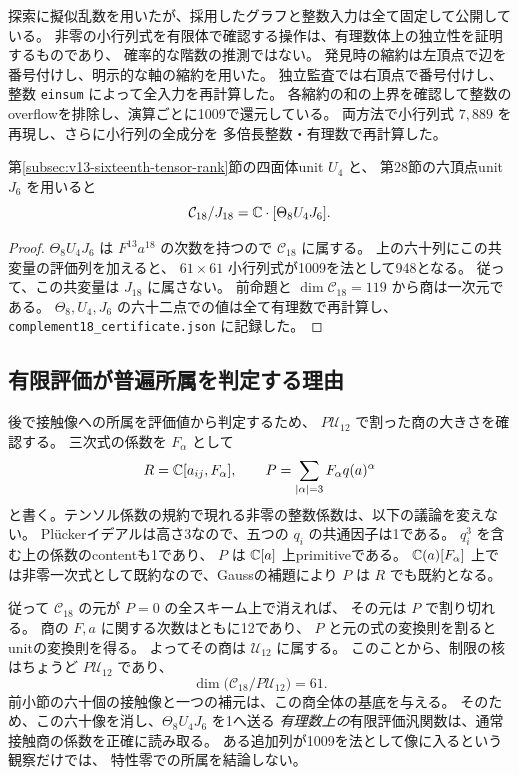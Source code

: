 \begin{remark}[有限体の役割と独立な再検算]
探索に擬似乱数を用いたが、採用したグラフと整数入力は全て固定して公開している。
非零の小行列式を有限体で確認する操作は、有理数体上の独立性を証明するものであり、
確率的な階数の推測ではない。
発見時の縮約は左頂点で辺を番号付けし、明示的な軸の縮約を用いた。
独立監査では右頂点で番号付けし、整数 \texttt{einsum} によって全入力を再計算した。
各縮約の和の上界を確認して整数のoverflowを排除し、演算ごとに1009で還元している。
両方法で小行列式 $7,889$ を再現し、さらに小行列の全成分を
多倍長整数・有理数で再計算した。
\end{remark}

\begin{proposition}[18次の通常商]
\label{prop:v14-ordinary-eighteenth-quotient}
第\ref{subsec:v13-sixteenth-tensor-rank}節の四面体unit $U_4$ と、
第28節の六頂点unit $J_6$ を用いると
\[
                   \mathcal C_{18}/J_{18}
                         =\mathbb C\cdot[\Theta_8U_4J_6].
\]
\end{proposition}
\begin{proof}
$\Theta_8U_4J_6$ は $F^{13}a^{18}$ の次数を持つので
$\mathcal C_{18}$ に属する。
上の六十列にこの共変量の評価列を加えると、
$61\times61$ 小行列式が1009を法として948となる。
従って、この共変量は $J_{18}$ に属さない。
前命題と $\dim\mathcal C_{18}=119$ から商は一次元である。
$\Theta_8,U_4,J_6$ の六十二点での値は全て有理数で再計算し、
\texttt{complement18\_certificate.json} に記録した。
\end{proof}

\subsection{有限評価が普遍所属を判定する理由}
\label{subsec:v14-evaluation-and-divisibility}

後で接触像への所属を評価値から判定するため、
$P\mathcal U_{12}$ で割った商の大きさを確認する。
三次式の係数を $F_\alpha$ として
\[
 R=\mathbb C[a_{ij},F_\alpha],\qquad
 P=\sum_{|\alpha|=3}F_\alpha q(a)^\alpha
\]
と書く。テンソル係数の規約で現れる非零の整数係数は、以下の議論を変えない。
Pl\"uckerイデアルは高さ3なので、五つの $q_i$ の共通因子は1である。
$q_i^3$ を含む上の係数のcontentも1であり、
$P$ は $\mathbb C[a]$ 上primitiveである。
$\mathbb C(a)[F_\alpha]$ 上では非零一次式として既約なので、Gaussの補題により
$P$ は $R$ でも既約となる。

従って $\mathcal C_{18}$ の元が $P=0$ の全スキーム上で消えれば、
その元は $P$ で割り切れる。
商の $F,a$ に関する次数はともに12であり、
$P$ と元の式の変換則を割るとunitの変換則を得る。
よってその商は $\mathcal U_{12}$ に属する。
このことから、制限の核はちょうど $P\mathcal U_{12}$ であり、
\[
                         \dim\bigl(\mathcal C_{18}/P\mathcal U_{12}\bigr)=61.
\]
前小節の六十個の接触像と一つの補元は、この商全体の基底を与える。
そのため、この六十像を消し、$\Theta_8U_4J_6$ を1へ送る
\emph{有理数上の}有限評価汎関数は、通常接触商の係数を正確に読み取る。
ある追加列が1009を法として像に入るという観察だけでは、
特性零での所属を結論しない。

